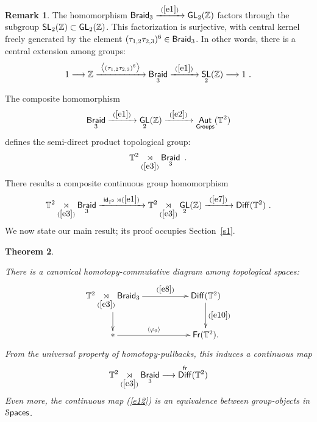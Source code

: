 \documentclass{amsart}
\newtheorem{theorem}{Theorem}[section]
\theoremstyle{definition}
\newtheorem{remark}[theorem]{Remark}
\theoremstyle{remark}
\DeclareMathOperator{\Aut}{\sf Aut}
\DeclareMathOperator{\Diff}{{\sf Diff}}
\DeclareMathOperator{\Spaces}{\cS\mathsf{paces}}
\DeclareMathOperator{\fr}{\sf fr}
\newcommand{\lag}{\langle}
\newcommand{\rag}{\rangle}
\newcommand{\xra}{\xrightarrow}
\DeclareMathOperator{\Braid}{\sf Braid}
\DeclareMathOperator{\GL}{\sf GL}
\DeclareMathOperator{\SL}{\sf SL}
\DeclareMathOperator{\Fr}{\sf Fr}
\DeclareMathOperator{\id}{\sf id}
\begin{document}
\begin{remark}\label{r1}
The homomorphism $\Braid_3\xra{~(\ref{e1})~} \GL_2(\ZZ)$ factors through the subgroup $\SL_2(\ZZ)\subset \GL_2(\ZZ)$.  
This factorization is surjective, with central kernel freely generated by the element $(\tau_{1,2}\tau_{2,3})^6 \in \Braid_3$.
In other words, there is a central extension among groups:
\begin{equation}\label{e16}
1
\longrightarrow
\ZZ
\xra{~\bigl\lag (\tau_{1,2}\tau_{2,3})^6 \bigr\rag~}
\Braid_3
\xra{~(\ref{e1})~}
\SL_2(\ZZ)
\longrightarrow
1
~.
\end{equation}

\end{remark}
The composite homomorphism 
\begin{equation}
\label{e3}
\Braid_3
\xra{~(\ref{e1})~}
\GL_2(\ZZ)
\xra{~(\ref{e2})~}
\Aut_{\sf Groups}(\TT^2)
\end{equation}
defines the semi-direct product topological group:
\begin{equation}
\label{e4}
\TT^2 \underset{(\ref{e3})}\rtimes \Braid_3
~.
\end{equation}
There results a composite continuous group homomorphism
\begin{equation}\label{e8}
\TT^2 \underset{(\ref{e3})}\rtimes \Braid_3
\xra{~\id_{\TT^2} \rtimes (\ref{e1})~}
\TT^2 \underset{(\ref{e3})}\rtimes \GL_2(\ZZ)
\xra{~(\ref{e7})~}
\Diff(\TT^2)
~.
\end{equation}
We now state our main result; its proof occupies Section~\ref{s1}.  
\begin{theorem}\label{main.theorem}

There is a canonical homotopy-commutative diagram among topological spaces:
\begin{equation}\label{e14}
\xymatrix{
\TT^2 \underset{(\ref{e3})}\rtimes \Braid_3  \ar[rr]^-{(\ref{e8})} \ar[d]
&&
\Diff(\TT^2) \ar[d]^-{(\ref{e10})}
\\
\ast \ar[rr]^-{\lag \varphi_0\rag}
&&
\Fr(\TT^2)
.
}
\end{equation}
From the universal property of homotopy-pullbacks, this induces a continuous map 
\begin{equation}\label{e12}
\TT^2 \underset{(\ref{e3})}\rtimes \Braid_3
\longrightarrow
\Diff^{\fr}(\TT^2)
\end{equation}
Even more, the continuous map (\ref{e12}) is an equivalence between group-objects in $\Spaces$.
\end{theorem}
\end{document}
